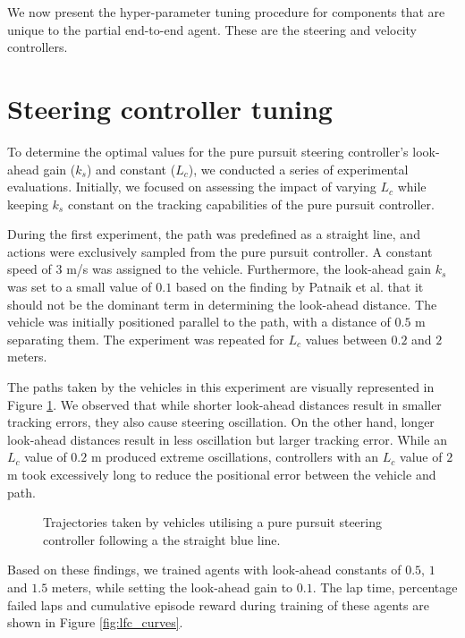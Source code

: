 We now present the hyper-parameter tuning procedure for components that are unique to the partial end-to-end agent.
These are the steering and velocity controllers.




\section{Steering controller tuning}

To determine the optimal values for the pure pursuit steering controller's look-ahead gain ($k_s$) and constant ($L_c$), we conducted a series of experimental evaluations. 
Initially, we focused on assessing the impact of varying $L_c$ while keeping $k_s$ constant on the tracking capabilities of the pure pursuit controller.

During the first experiment, the path was predefined as a straight line, and actions were exclusively sampled from the pure pursuit controller. 
A constant speed of $3$ m/s was assigned to the vehicle.
Furthermore, the look-ahead gain $k_s$ was set to a small value of $0.1$ based on the finding by Patnaik et al. \cite{Patnaik2020} that it should not be the dominant term in determining the look-ahead distance.
The vehicle was initially positioned parallel to the path, with a distance of $0.5$ m separating them. 
The experiment was repeated for $L_c$ values between $0.2$ and $2$ meters.

The paths taken by the vehicles in this experiment are visually represented in Figure \ref{fig:lfc}. 
We observed that while shorter look-ahead distances result in smaller tracking errors, they also cause steering oscillation.
On the other hand, longer look-ahead distances result in less oscillation but larger tracking error.
While an $L_c$ value of $0.2$ m produced extreme oscillations, controllers with an $L_c$ value of $2$ m took excessively long to reduce the positional error between the vehicle and path. 

\begin{figure}[htb!]
    \centering
    
    \caption[Tracjectories taken by vehicles following a straight line starting from an offset position]{Trajectories taken by vehicles utilising a pure pursuit steering controller following a the straight blue line.}
    \label{fig:lfc}
\end{figure}

Based on these findings, we trained agents with  look-ahead constants of $0.5$, $1$ and $1.5$ meters, while setting the look-ahead gain to $0.1$.
The lap time, percentage failed laps and cumulative episode reward during training of these agents are shown in Figure \ref{fig:lfc_curves}.

